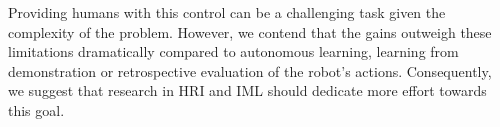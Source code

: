 \documentclass[letterpaper, 10 pt, conference]{ieeeconf}  %
\begin{document}
Providing humans with this control can be a challenging task given the complexity of the problem. However, we contend that the gains outweigh these limitations dramatically compared to autonomous learning, learning from demonstration or retrospective evaluation of the robot's actions. Consequently, we suggest that research in HRI and IML should dedicate more effort towards this goal.




\end{document}
